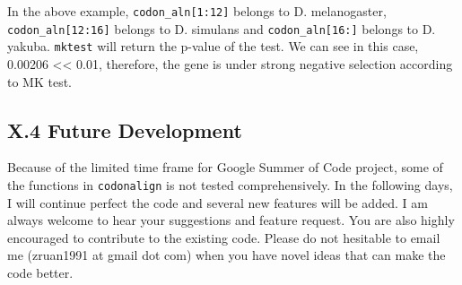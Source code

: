 \documentclass{article}
\begin{document}
In the above example, \texttt{codon\_aln{[}1:12{]}} belongs to
D. melanogaster, \texttt{codon\_aln{[}12:16{]}} belongs to D. simulans
and \texttt{codon\_aln{[}16:{]}} belongs to D. yakuba. \texttt{mktest}
will return the p-value of the test. We can see in this case, 0.00206
\textless{}\textless{} 0.01, therefore, the gene is under strong
negative selection according to MK test.

\subsection{X.4 Future Development}

Because of the limited time frame for Google Summer of Code project,
some of the functions in \texttt{codonalign} is not tested
comprehensively. In the following days, I will continue perfect the code
and several new features will be added. I am always welcome to hear your
suggestions and feature request. You are also highly encouraged to
contribute to the existing code. Please do not hesitable to email me
(zruan1991 at gmail dot com) when you have novel ideas that can make the
code better.
\end{document}
